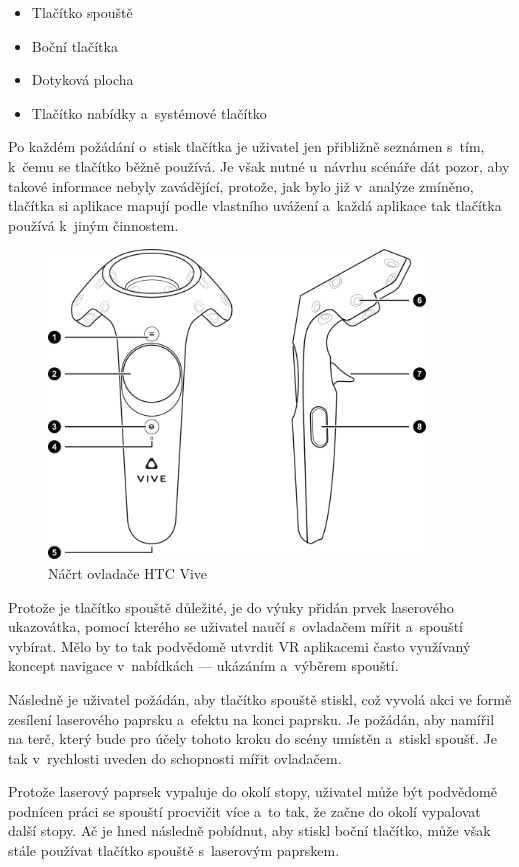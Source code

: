\begin{itemize}
\tightlist
\item
  Tlačítko spouště
\item
  Boční tlačítka
\item
  Dotyková plocha
\item
  Tlačítko nabídky a~systémové tlačítko
\end{itemize}

Po každém požádání o~stisk tlačítka je uživatel jen přibližně seznámen
s~tím, k~čemu se tlačítko běžně používá. Je však nutné u~návrhu scénáře
dát pozor, aby takové informace nebyly zavádějící, protože, jak bylo již
v~analýze zmíněno, tlačítka si aplikace mapují podle vlastního uvážení
a~každá aplikace tak tlačítka používá k~jiným činnostem.

\begin{figure}[h!]
\centering
\includegraphics[width=10cm]{src/assets/vive-controller.png}
\caption{Náčrt ovladače HTC Vive\autocite{htcvivemanual}}
\end{figure}

Protože je tlačítko spouště důležité, je do výuky přidán prvek
laserového ukazovátka, pomocí kterého se uživatel naučí s~ovladačem
mířit a~spouští vybírat. Mělo by to tak podvědomě utvrdit VR
aplikacemi často využívaný koncept navigace v~nabídkách --- ukázáním a~výběrem
spouští.

Následně je uživatel požádán, aby tlačítko spouště stiskl, což vyvolá
akci ve formě zesílení laserového paprsku a~efektu na konci paprsku.
Je požádán, aby namířil na terč, který bude pro účely tohoto
kroku do scény umístěn a~stiskl spoušť. Je tak v~rychlosti uveden do
schopnosti mířit ovladačem.

Protože laserový paprsek vypaluje do okolí stopy, uživatel může být
podvědomě podnícen práci se spouští procvičit více a~to tak, že začne do
okolí vypalovat další stopy. Ač je hned následně pobídnut, aby stiskl
boční tlačítko, může však stále používat tlačítko spouště
s~laserovým paprskem.

